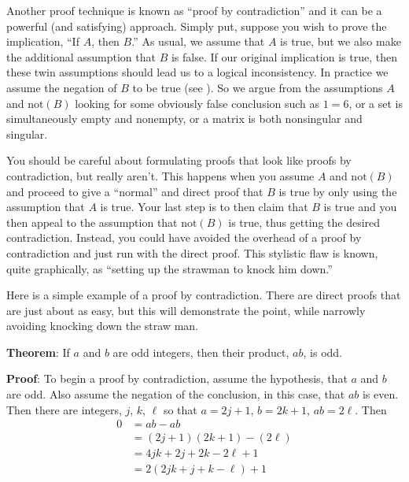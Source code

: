 Another proof technique is known as ``proof by contradiction'' and it can be a powerful (and satisfying) approach.  Simply put, suppose you wish to prove the implication, ``If $A$, then $B$.''   As usual, we assume that $A$ is true, but we also make the additional assumption that $B$ is false.  If our original implication is true, then these twin assumptions should lead us to a logical inconsistency.  In practice we assume the negation of $B$ to be true (see ).  So we argue from the assumptions $A$ and $\text{not}(B)$ looking for some obviously false conclusion such as $1=6$, or a set is simultaneously empty and nonempty, or a matrix is both nonsingular and singular.\par
%
You should be careful about formulating proofs that look like proofs by contradiction, but really aren't.  This happens when you assume $A$ and $\text{not}(B)$ and proceed to give a ``normal'' and direct proof that $B$ is true by only using the assumption that $A$ is true.  Your last step is to then claim that $B$ is true and you then appeal to the assumption that $\text{not}(B)$ is true, thus getting the desired contradiction.  Instead, you could have avoided the overhead of a proof by contradiction and just run with the direct proof.  This stylistic flaw is known, quite graphically, as ``setting up the strawman to knock him down.''\par
%
Here is a simple example of a proof by contradiction.  There are direct proofs that are just about as easy, but this will demonstrate the point, while narrowly avoiding knocking down the straw man.\par\medskip
%
{\bf Theorem}:  If $a$ and $b$ are odd integers, then their product, $ab$, is odd.\par\medskip
%
{\bf Proof}:  To begin a proof by contradiction, assume the hypothesis, that $a$ and $b$ are odd.  Also assume the negation of the conclusion, in this case, that $ab$ is even.  Then there are integers, $j$, $k$, $\ell$ so that $a=2j+1$, $b=2k+1$, $ab=2\ell$.  Then
%
\begin{align*}
0
&=ab-ab\\
&=(2j+1)(2k+1)-(2\ell)\\
&=4jk+2j+2k-2\ell+1\\
&=2\left(2jk+j+k-\ell\right)+1\\
\end{align*}
